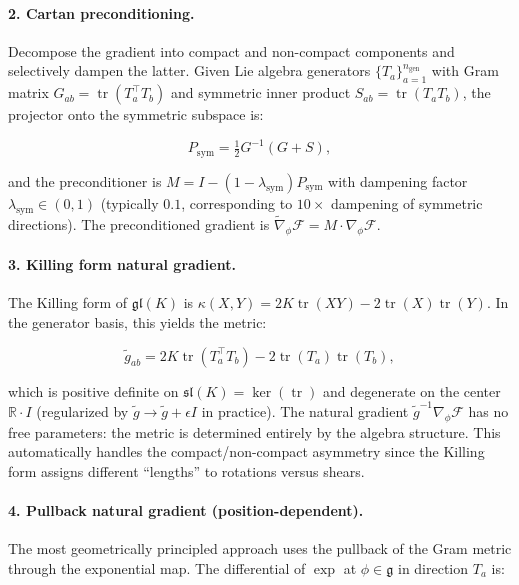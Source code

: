 \documentclass[twoside,11pt]{article}
\begin{document}
\paragraph{2. Cartan preconditioning.}
Decompose the gradient into compact and non-compact components and selectively dampen the latter. Given Lie algebra generators $\{T_a\}_{a=1}^{n_{\mathrm{gen}}}$ with Gram matrix $G_{ab} = \operatorname{tr}(T_a^\top T_b)$ and symmetric inner product $S_{ab} = \operatorname{tr}(T_a T_b)$, the projector onto the symmetric subspace is:

\begin{equation}
P_{\mathrm{sym}} = \tfrac{1}{2}G^{-1}(G + S),
\end{equation}

and the preconditioner is $M = I - (1 - \lambda_{\mathrm{sym}}) P_{\mathrm{sym}}$ with dampening factor $\lambda_{\mathrm{sym}} \in (0, 1)$ (typically $0.1$, corresponding to $10\times$ dampening of symmetric directions). The preconditioned gradient is $\tilde{\nabla}_\phi \mathcal{F} = M \cdot \nabla_\phi \mathcal{F}$.

\paragraph{3. Killing form natural gradient.}
The Killing form of $\mathfrak{gl}(K)$ is $\kappa(X, Y) = 2K \operatorname{tr}(XY) - 2\operatorname{tr}(X)\operatorname{tr}(Y)$. In the generator basis, this yields the metric:

\begin{equation}
\tilde{g}_{ab} = 2K \operatorname{tr}(T_a^\top T_b) - 2\operatorname{tr}(T_a)\operatorname{tr}(T_b),
\label{eq:killing_metric}
\end{equation}

which is positive definite on $\mathfrak{sl}(K) = \ker(\operatorname{tr})$ and degenerate on the center $\mathbb{R} \cdot I$ (regularized by $\tilde{g} \to \tilde{g} + \epsilon I$ in practice). The natural gradient $\tilde{g}^{-1} \nabla_\phi \mathcal{F}$ has no free parameters: the metric is determined entirely by the algebra structure. This automatically handles the compact/non-compact asymmetry since the Killing form assigns different ``lengths'' to rotations versus shears.

\paragraph{4. Pullback natural gradient (position-dependent).}
The most geometrically principled approach uses the pullback of the Gram metric through the exponential map. The differential of $\exp$ at $\phi \in \mathfrak{g}$ in direction $T_a$ is:
\end{document}
